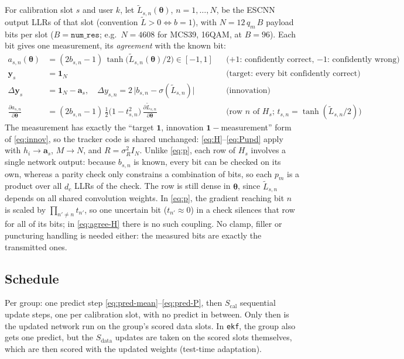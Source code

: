 \documentclass{article}
\newcommand{\state}{\boldsymbol{\theta}}
\begin{document}
For calibration slot $s$ and user $k$, let $\widetilde{L}_{s,n}(\state)$, $n=1,\dots,N$, be the
ESCNN output LLRs of that slot (convention $\widetilde{L}>0 \Leftrightarrow b=1$), with
$N = 12\, q_m\, B$ payload bits per slot ($B=\texttt{num\_res}$; e.g.\ $N=4608$ for MCS39, 16QAM, at
$B=96$). Each bit gives one measurement, its \emph{agreement} with the known bit:
\begin{align}
a_{s,n}(\state) &= (2b_{s,n}-1)\,\tanh\!\big(\widetilde{L}_{s,n}(\state)/2\big) \in [-1,1]
  && \text{($+1$: confidently correct, $-1$: confidently wrong)} \label{eq:agree}\\
\mathbf{y}_s &= \mathbf{1}_N
  && \text{(target: every bit confidently correct)} \\
\Delta\mathbf{y}_s &= \mathbf{1}_N - \mathbf{a}_s,\quad
\Delta y_{s,n} = 2\,\big|b_{s,n} - \sigma(\widetilde{L}_{s,n})\big|
  && \text{(innovation)} \label{eq:agree-innov}\\
\frac{\partial a_{s,n}}{\partial \state} &= (2b_{s,n}-1)\,\tfrac12\big(1-t_{s,n}^2\big)\,
  \frac{\partial \widetilde{L}_{s,n}}{\partial \state}
  && \text{(row $n$ of $H_s$; $t_{s,n}=\tanh(\widetilde{L}_{s,n}/2)$)} \label{eq:agree-H}
\end{align}
The measurement has exactly the ``target $\mathbf{1}$, innovation $\mathbf{1}-$measurement''
form of \eqref{eq:innov}, so the tracker code is shared unchanged: \eqref{eq:H}--\eqref{eq:Pupd}
apply with $h_i \to \mathbf{a}_s$, $M\to N$, and $R=\sigma_R^2 I_N$. Unlike \eqref{eq:p}, each row
of $H_s$ involves a single network output: because $b_{s,n}$ is known, every bit can be checked
on its own, whereas a parity check only constrains a combination of bits, so each $p_m$ is a
product over all $d_c$ LLRs of the check. The row is still dense in $\state$, since
$\widetilde{L}_{s,n}$ depends on all shared convolution weights. In \eqref{eq:p}, the gradient
reaching bit $n$ is scaled by $\prod_{n'\neq n} t_{n'}$, so one uncertain bit ($t_{n'}\approx0$)
in a check silences that row for all of its bits; in \eqref{eq:agree-H} there is no such
coupling. No clamp, filler or puncturing handling is needed either: the measured bits are
exactly the transmitted ones.

\subsection{Schedule}

Per group: one predict step \eqref{eq:pred-mean}--\eqref{eq:pred-P}, then $S_{\text{cal}}$
sequential update steps, one per calibration slot, with no predict in between. Only then is the
updated network run on the group's scored data slots. In \texttt{ekf}, the group also gets one
predict, but the $S_{\text{data}}$ updates are taken on the scored slots themselves, which are
then scored with the updated weights (test-time adaptation).
\end{document}
